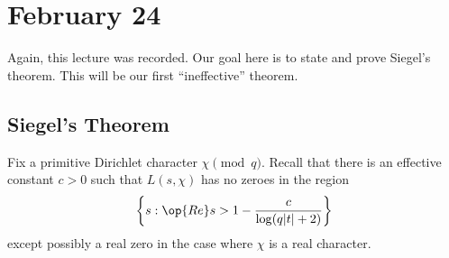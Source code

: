 \documentclass[../notes.tex]{subfiles}
\begin{document}
\section{February 24}

Again, this lecture was recorded. Our goal here is to state and prove Siegel's theorem. This will be our first ``ineffective'' theorem.

\subsection{Siegel's Theorem}
Fix a primitive Dirichlet character $\chi\pmod q$. Recall that there is an effective constant $c>0$ such that $L(s,\chi)$ has no zeroes in the region
\[\left\{s:\op{Re}s>1-\frac c{\log(q|t|+2)}\right\}\]
except possibly a real zero in the case where $\chi$ is a real character.
\end{document}
